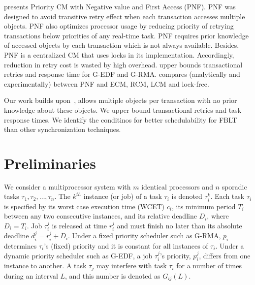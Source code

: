 \documentclass[prodmode,acmtecs]{acmsmall}
\begin{document}
\cite{shambake_phd_proposal} presents Priority CM with Negative value and First Access (PNF). PNF was designed to avoid transitive retry effect when each transaction accesses multiple objects. PNF also optimizes processor usage by reducing priority of retrying transactions below priorities of any real-time task. PNF requires prior knowledge of accessed objects by each transaction which is not always available. Besides, PNF is a centralized CM that uses locks in its implementation. Accordingly, reduction in retry cost is wasted by high overhead. \cite{shambake_phd_proposal} upper bounds transactional retries and response time for G-EDF and G-RMA. \cite{shambake_phd_proposal} compares (analytically and experimentally) between PNF and ECM, RCM, LCM and lock-free.

Our work builds upon~\cite{stmconcurrencycontrol:emsoft11,lcmdac2012,shambake_phd_proposal}, allows multiple objects per transaction with no prior knowledge about these objects. We upper bound transactional retries and task response times. We identify the conditinos for better schedulability for FBLT than other synchronization techniques.
\section{Preliminaries}
\label{sec:model}

We consider a multiprocessor system with $m$ identical processors and $n$ sporadic tasks $\tau_1, \tau_2,\ldots, \tau_n$. The $k^{th}$ instance (or job) of a task $\tau_i$ is denoted $\tau_i^k$. Each task $\tau_i$ is specified by its worst case execution time (WCET) $c_i$, its minimum period $T_i$ between any two consecutive instances, and its relative deadline $D_i$, where $D_i=T_i$. Job $\tau_i^j$ is released at time $r_i^j$ and must finish no later than its absolute deadline $d_i^j=r_i^j+D_i$. Under a fixed priority scheduler such as G-RMA, $p_i$ determines $\tau_i$'s (fixed) priority and it is constant for all instances of $\tau_i$. Under a dynamic priority scheduler such as G-EDF, a job $\tau_i^j$'s priority, $p_i^j$, differs from one instance to another. 
A task $\tau_j$ may interfere with task $\tau_i$ for a number of times during an interval $L$, and this number is denoted as $G_{ij}(L)$. 
\end{document}

